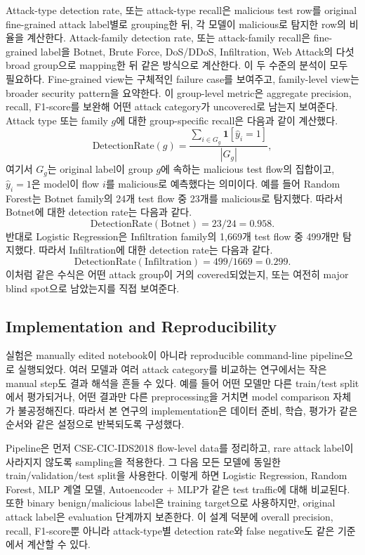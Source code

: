 \documentclass[sigconf,nonacm]{acmart}
\begin{document}
Attack-type detection rate, 또는 attack-type recall은 malicious test row를 original fine-grained attack label별로 grouping한 뒤, 각 모델이 malicious로 탐지한 row의 비율을 계산한다.
Attack-family detection rate, 또는 attack-family recall은 fine-grained label을 Botnet, Brute Force, DoS/DDoS, Infiltration, Web Attack의 다섯 broad group으로 mapping한 뒤 같은 방식으로 계산한다.
이 두 수준의 분석이 모두 필요하다.
Fine-grained view는 구체적인 failure case를 보여주고, family-level view는 broader security pattern을 요약한다.
이 group-level metric은 aggregate precision, recall, F1-score를 보완해 어떤 attack category가 uncovered로 남는지 보여준다.
Attack type 또는 family \(g\)에 대한 group-specific recall은 다음과 같이 계산했다.
\begin{equation}
\mathrm{DetectionRate}(g) =
\frac{\sum_{i \in G_g} \mathbf{1}[\hat{y}_i = 1]}
{|G_g|},
\end{equation}
여기서 \(G_g\)는 original label이 group \(g\)에 속하는 malicious test flow의 집합이고, \(\hat{y}_i=1\)은 model이 flow \(i\)를 malicious로 예측했다는 의미이다.
예를 들어 Random Forest는 Botnet family의 24개 test flow 중 23개를 malicious로 탐지했다.
따라서 Botnet에 대한 detection rate는 다음과 같다.
\[
\mathrm{DetectionRate}(\mathrm{Botnet}) = 23/24 = 0.958.
\]
반대로 Logistic Regression은 Infiltration family의 1,669개 test flow 중 499개만 탐지했다.
따라서 Infiltration에 대한 detection rate는 다음과 같다.
\[
\mathrm{DetectionRate}(\mathrm{Infiltration}) = 499/1669 = 0.299.
\]
이처럼 같은 수식은 어떤 attack group이 거의 covered되었는지, 또는 여전히 major blind spot으로 남았는지를 직접 보여준다.

\subsection{Implementation and Reproducibility}

실험은 manually edited notebook이 아니라 reproducible command-line pipeline으로 실행되었다.
여러 모델과 여러 attack category를 비교하는 연구에서는 작은 manual step도 결과 해석을 흔들 수 있다.
예를 들어 어떤 모델만 다른 train/test split에서 평가되거나, 어떤 결과만 다른 preprocessing을 거치면 model comparison 자체가 불공정해진다.
따라서 본 연구의 implementation은 데이터 준비, 학습, 평가가 같은 순서와 같은 설정으로 반복되도록 구성했다.

Pipeline은 먼저 CSE-CIC-IDS2018 flow-level data를 정리하고, rare attack label이 사라지지 않도록 sampling을 적용한다.
그 다음 모든 모델에 동일한 train/validation/test split을 사용한다.
이렇게 하면 Logistic Regression, Random Forest, MLP 계열 모델, Autoencoder + MLP가 같은 test traffic에 대해 비교된다.
또한 binary benign/malicious label은 training target으로 사용하지만, original attack label은 evaluation 단계까지 보존한다.
이 설계 덕분에 overall precision, recall, F1-score뿐 아니라 attack-type별 detection rate와 false negative도 같은 기준에서 계산할 수 있다.
\end{document}
